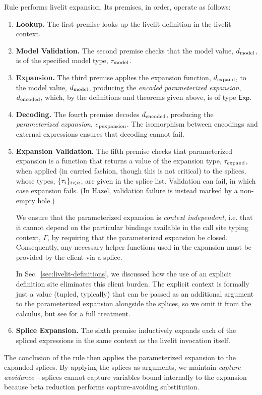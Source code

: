 Rule  performs livelit expansion. Its premises, in order, operate as follows:
\begin{enumerate}[itemsep=3px,leftmargin=*]
    \item \textbf{Lookup.} The first premise looks up the livelit definition in the livelit context.
    \item \textbf{Model Validation.} The second premise checks that the model value, $d_\text{model}$, is of the
    specified model type, $\tau_\text{model}$.
    \item \textbf{Expansion.} The third premise applies the expansion function, $d_\text{expand}$, to the model value, $d_\text{model}$,
    producing the \emph{encoded parameterized expansion}, $d_\text{encoded}$, which, by the definitions and theorems given above, is of type $\mathsf{Exp}$.
    \item \textbf{Decoding.} The fourth premise decodes $d_\text{encoded}$, producing the \emph{parameterized expansion}, $e_\text{pexpansion}$. The isomorphism between encodings and external expressions ensures that decoding cannot fail.
    \item \textbf{Expansion Validation.} The fifth premise checks that {parameterized expansion} is a function that returns a value of the expansion type, $\tau_\text{expand}$, when applied (in curried fashion, though this is not critical)
    to the splices, whose types, $\{\tau_i\}_{i < n}$, are given in the splice list.
    Validation can fail, in which case expansion fails. (In Hazel, validation failure is instead marked by a non-empty hole.)
    
    We ensure that the parameterized expansion is \emph{context independent},
    i.e. that it cannot depend on the particular bindings available in the call site typing context, $\Gamma$, 
     by
    requiring that the parameterized expansion be
    closed. Consequently, any necessary helper functions used in the expansion must be provided by the client
    via a splice. 

    In Sec.~\ref{sec:livelit-definitions}, we discussed how the use of an explicit definition site  eliminates this client burden.
    The explicit context is formally just a value (tupled, typically) that can be passed as an additional argument to the parameterized expansion alongside the splices, 
    so we omit it from the calculus, but see \cite{TLMs} for a full treatment.
    
    \item \textbf{Splice Expansion.} The sixth premise inductively expands each of the spliced expressions in the same context as the livelit
    invocation itself.
\end{enumerate}
The conclusion of the rule then applies the parameterized expansion to the expanded splices.
By applying the splices as arguments, we maintain \emph{capture avoidance} -- splices cannot capture variables
bound internally to the expansion because beta reduction performs capture-avoiding substitution. 

